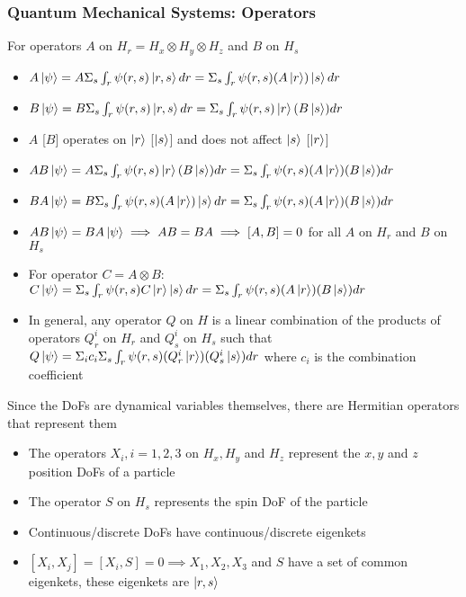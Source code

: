 \documentclass[8pt,t,mathserif,aspectratio=169]{beamer}
\begin{document}
\begin{frame}
  \frametitle{Quantum Mechanical Systems: Operators}
  \vspace{1mm}
  For operators $A$ on $H_r = H_x \otimes H_y \otimes H_z$ and $B$ on $H_s$
  \begin{itemize}
    \item $A \ket{\psi} = A \Sigma_s \int_r \psi(r,s) \ket{r,s} dr = \Sigma_s\int_r \psi(r,s) (A \ket{r}) \ket{s} dr$
    \item $B \ket{\psi} = B \Sigma_s \int_r \psi(r,s) \ket{r,s} dr = \Sigma_s\int_r \psi(r,s) \ket{r} (B \ket{s}) dr$
    \item $A$ [$B$] operates on $\ket{r}$ [$\ket{s}$] and does not affect $\ket{s}$ [$\ket{r}$]
    \item $AB \ket{\psi} = A \Sigma_s \int_r \psi(r,s) \ket{r} (B \ket{s}) dr = \Sigma_s\int_r \psi(r,s) (A \ket{r}) (B \ket{s}) dr$
    \item $BA \ket{\psi} = B \Sigma_s \int_r \psi(r,s) (A \ket{r}) \ket{s} dr = \Sigma_s\int_r \psi(r,s) (A \ket{r}) (B \ket{s}) dr$
    \item $AB \ket{\psi} = BA \ket{\psi} \implies AB = BA \implies [A,B] = 0$ for all $A$ on $H_r$ and $B$ on $H_s$
    \item For operator $C = A \otimes B$: $C \ket{\psi} = \Sigma_s \int_r \psi(r,s) C \ket{r} \ket{s} dr = \Sigma_s \int_r \psi(r,s) (A \ket{r}) (B \ket{s}) dr$
    \item In general, any operator $Q$ on $H$ is a linear combination of the products of operators $Q^i_r$ on $H_r$ and $Q^i_s$ on $H_s$ such that $Q \ket{\psi} = \Sigma_i c_i \Sigma_s \int_r \psi(r,s) (Q^i_r \ket{r}) (Q^i_s \ket{s}) dr$ where $c_i$ is the combination coefficient
  \end{itemize}
  Since the DoFs are dynamical variables themselves, there are Hermitian operators that represent them
  \begin{itemize}
    \item The operators $X_i, i = 1,2,3$ on $H_x,H_y$ and $H_z$ represent the $x,y$ and $z$ position DoFs of a particle
    \item The operator $S$ on $H_s$ represents the spin DoF of the particle
    \item Continuous/discrete DoFs have continuous/discrete eigenkets
    \item $[X_i,X_j] = [X_i,S] = 0 \implies X_1,X_2,X_3$ and $S$ have a set of common eigenkets, these eigenkets are $\ket{r,s}$
  \end{itemize}
\end{frame}
\end{document}
